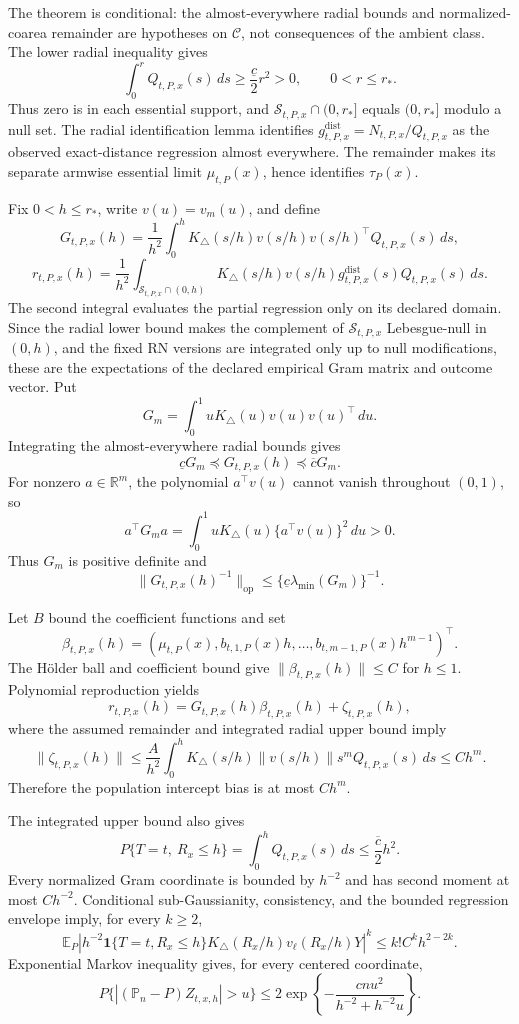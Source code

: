 The theorem is conditional: the almost-everywhere radial bounds and normalized-coarea remainder are hypotheses on \(\mathcal C\), not consequences of the ambient class.  The lower radial inequality gives
\[
 \int_0^rQ_{t,P,x}(s)\,ds\geq\frac{\underline c}{2}r^2>0,
 \qquad 0<r\leq r_*.
\]
Thus zero is in each essential support, and \(\mathcal S_{t,P,x}\cap(0,r_*]\) equals \((0,r_*]\) modulo a null set.  The radial identification lemma identifies \(g^{\mathrm{dist}}_{t,P,x}=N_{t,P,x}/Q_{t,P,x}\) as the observed exact-distance regression almost everywhere.  The remainder makes its separate armwise essential limit \(\mu_{t,P}(x)\), hence identifies \(\tau_P(x)\).

Fix \(0<h\leq r_*\), write \(v(u)=v_m(u)\), and define
\[
 G_{t,P,x}(h)=\frac1{h^2}\int_0^hK_\triangle(s/h)
 v(s/h)v(s/h)^\top Q_{t,P,x}(s)\,ds,
\]
\[
 r_{t,P,x}(h)=\frac1{h^2}
 \int_{\mathcal S_{t,P,x}\cap(0,h)}K_\triangle(s/h)
 v(s/h)g^{\mathrm{dist}}_{t,P,x}(s)Q_{t,P,x}(s)\,ds.
\]
The second integral evaluates the partial regression only on its declared domain.  Since the radial lower bound makes the complement of \(\mathcal S_{t,P,x}\) Lebesgue-null in \((0,h)\), and the fixed RN versions are integrated only up to null modifications, these are the expectations of the declared empirical Gram matrix and outcome vector.  Put
\[
 G_m=\int_0^1uK_\triangle(u)v(u)v(u)^\top\,du.
\]
Integrating the almost-everywhere radial bounds gives
\[
 \underline cG_m\preceq G_{t,P,x}(h)\preceq\overline cG_m.
\]
For nonzero \(a\in\mathbb R^m\), the polynomial \(a^\top v(u)\) cannot vanish throughout \((0,1)\), so
\[
 a^\top G_ma=\int_0^1uK_\triangle(u)\{a^\top v(u)\}^2\,du>0.
\]
Thus \(G_m\) is positive definite and
\[
 \lVert G_{t,P,x}(h)^{-1}\rVert_{\mathrm{op}}
 \leq\{\underline c\lambda_{\min}(G_m)\}^{-1}.
\]

Let \(B\) bound the coefficient functions and set
\[
 \beta_{t,P,x}(h)=
 (\mu_{t,P}(x),b_{t,1,P}(x)h,\ldots,
 b_{t,m-1,P}(x)h^{m-1})^\top.
\]
The H\"older ball and coefficient bound give \(\lVert\beta_{t,P,x}(h)\rVert\leq C\) for \(h\leq1\).  Polynomial reproduction yields
\[
 r_{t,P,x}(h)=G_{t,P,x}(h)\beta_{t,P,x}(h)+\zeta_{t,P,x}(h),
\]
where the assumed remainder and integrated radial upper bound imply
\[
 \lVert\zeta_{t,P,x}(h)\rVert
 \leq\frac A{h^2}\int_0^hK_\triangle(s/h)
 \lVert v(s/h)\rVert s^mQ_{t,P,x}(s)\,ds
 \leq Ch^m.
\]
Therefore the population intercept bias is at most \(Ch^m\).

The integrated upper bound also gives
\[
 P\{T=t,\ R_x\leq h\}=\int_0^hQ_{t,P,x}(s)\,ds
 \leq\frac{\overline c}{2}h^2.
\]
Every normalized Gram coordinate is bounded by \(h^{-2}\) and has second moment at most \(Ch^{-2}\).  Conditional sub-Gaussianity, consistency, and the bounded regression envelope imply, for every \(k\geq2\),
\[
 \mathbb E_P\left|h^{-2}\mathbf1\{T=t,R_x\leq h\}
 K_\triangle(R_x/h)v_\ell(R_x/h)Y\right|^k
 \leq k!C^kh^{2-2k}.
\]
Exponential Markov inequality gives, for every centered coordinate,
\[
 P\{|(\mathbb P_n-P)Z_{t,x,h}|>u\}
 \leq2\exp\!\left\{-\frac{cnu^2}{h^{-2}+h^{-2}u}\right\}.
\]

